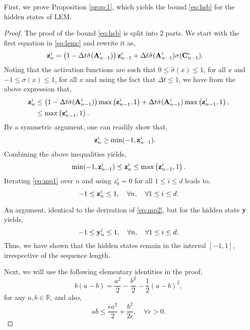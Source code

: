 \documentclass{article} \usepackage{iclr2022_conference,times}
\newcommand{\by}{{\bf y}}
\newcommand{\bz}{{\bf z}}
\newcommand{\bA}{{\bf A}}
\newcommand{\bC}{{\bf C}}
\newcommand{\R}{{\mathbb R}}
\newcommand{\Dt}{{\Delta t}}
\begin{document}
First, we prove Proposition \ref{prop:1}, which yields the bound \eqref{eq:hsb} for the hidden states of LEM.
\begin{proof}
The proof of the bound \eqref{eq:hsb} is split into 2 parts. We start with the first equation in \eqref{eq:lemc} and rewrite it as,
\begin{align*}
    \bz_{n}^i &= \left(1 - \Dt \hat{\sigma}(\bA_{n-1}^i) \right) \bz_{n-1}^i + \Dt \hat{\sigma}(\bA_{n-1}^i) \sigma(\bC_{n-1}^i).
\end{align*}
Noting that the activation functions are such that $0 \leq \hat{\sigma}(x) \leq 1$, for all $x$ and $-1 \leq \sigma(x) \leq 1$, for all $x$ and using the fact that $\Dt \leq 1$, we have from the above expression that,
\begin{align*}
    \bz_{n}^i &\leq \left(1 - \Dt \hat{\sigma}(\bA_{n-1}^i) \right) \max\left(\bz_{n-1}^i,1\right) +  \Dt \hat{\sigma}(\bA_{n-1}^i) \max\left(\bz_{n-1}^i,1\right) , \\
    &\leq \max\left(\bz_{n-1}^i,1\right).
    \end{align*}
By a symmetric argument, one can readily show that,
\begin{align*}
     \bz_{n}^i &\geq \min(-1,\bz_{n-1}^i).
\end{align*}
Combining the above inequalities yields,
\begin{equation}
    \label{eq:mp1}
   \min(-1,\bz_{n-1}^i) \leq  \bz_{n}^i \leq  \max\left(\bz_{n-1}^i,1\right).
\end{equation}
Iterating \eqref{eq:mp1} over $n$ and using $z_0^i=0$ for all $1 \leq i \leq d$ leads to,
\begin{equation}
    \label{eq:mp2}
    -1 \leq \bz_n^i \leq 1, \quad \forall n, \quad \forall 1 \leq i \leq d. 
\end{equation}

An argument, identical to the derivation of \eqref{eq:mp2}, but for the hidden state $\by$ yields,
\begin{equation}
    \label{eq:mp3}
    -1 \leq \by_n^i \leq 1, \quad \forall n, \quad \forall 1 \leq i \leq d. 
\end{equation}
Thus, we have shown that the hidden states remain in the interval $[-1,1]$, irrespective of the sequence length. 

Next, we will use the following elementary identities in the proof,
\begin{equation}
    \label{eq:id}
    b(a-b) = \frac{a^2}{2} - \frac{b^2}{2} - \frac{1}{2}\left(a-b\right)^2,
\end{equation}
for any $a,b \in \R$, and also,
\begin{equation}
    \label{eq:id1}
    ab \leq \frac{\epsilon a^2}{2} + \frac{b^2}{2 \epsilon}, \quad \forall \epsilon > 0.
\end{equation}


\end{proof}
\end{document}
